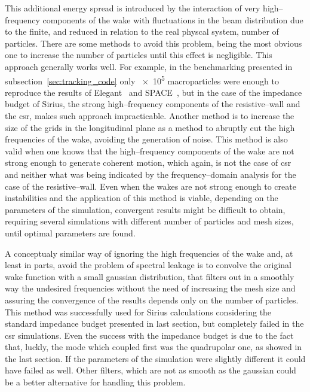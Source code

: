     This additional energy spread is introduced by the interaction of very high--frequency components of the wake with fluctuations in the beam distribution due to the finite, and reduced in relation to the real physcal system, number of particles. There are some methods to avoid this problem, being the most obvious one to increase the number of particles until this effect is negligible. This approach generally works well. For example, in the benchmarking presented in subsection~\ref{sec:tracking_code} only \num{e5} macroparticles were enough to reproduce the results of Elegant~\cite{Borland2000} and SPACE~\cite{Bassi2016}, but in the case of the impedance budget of Sirius, the strong high--frequency components of the resistive--wall and the \gls{csr}, makes such approach impracticable. Another method is to increase the size of the grids in the longitudinal plane as a method to abruptly cut the high frequencies of the wake, avoiding the generation of noise. This method is also valid when one knows that the high--frequency components of the wake are not strong enough to generate coherent motion, which again, is not the case of \gls{csr} and neither what was being indicated by the frequency--domain analysis for the case of the resistive--wall. Even when the wakes are not strong enough to create instabilities and the application of this method is viable, depending on the parameters of the simulation, convergent results might be difficult to obtain, requiring several simulations with different number of particles and mesh sizes, until optimal parameters are found.

    A conceptualy similar way of ignoring the high frequencies of the wake and, at least in parts, avoid the problem of spectral leakage is to convolve the original wake function with a small gaussian distribution, that filters out in a smoothly way the undesired frequencies without the need of increasing the mesh size and assuring the convergence of the results depends only on the number of particles. This method was successfully used for Sirius calculations considering the standard impedance budget presented in last section, but completely failed in the \gls{csr} simulations. Even the success with the impedance budget is due to the fact that, luckly, the mode which coupled first was the quadrupolar one, as showed in the last section. If the parameters of the simulation were slightly different it could have failed as well. Other filters, which are not as smooth as the gaussian could be a better alternative for handling this problem.

